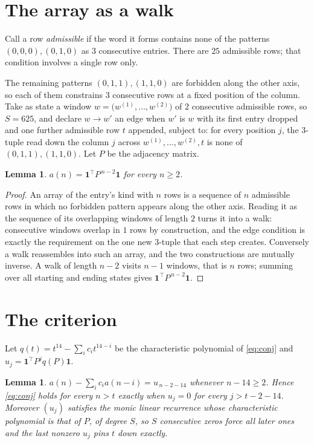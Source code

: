\documentclass[11pt,a4paper]{article}
\theoremstyle{plain}
\newtheorem{lemma}[theorem]{Lemma}
\theoremstyle{definition}
\begin{document}
\section{The array as a walk}

Call a row \emph{admissible} if the word it forms contains none of the patterns
$(0,0,0), (0,1,0)$ as $3$ consecutive entries. There are $25$ admissible rows; that condition
involves a single row only.

The remaining patterns $(0,1,1), (1,1,0)$ are forbidden along the other axis, so each of them
constrains $3$ consecutive rows at a fixed position of the column. Take as state a
window $w=\bigl(w^{(1)},\dots,w^{(2)}\bigr)$ of $2$ consecutive admissible
rows, so $S=625$, and declare $w\to w'$ an edge when $w'$ is $w$ with its first entry
dropped and one further admissible row $t$ appended, subject to: for every position
$j$, the $3$-tuple read down the column $j$ across $w^{(1)},\dots,w^{(2)},t$
is none of $(0,1,1), (1,1,0)$. Let $P$ be the adjacency matrix.

\begin{lemma}\label{lem:walk}
$a(n)=\mathbf{1}^{\!\top}P^{\,n-2}\mathbf{1}$ for every $n\ge2$.
\end{lemma}

\begin{proof}
An array of the entry's kind with $n$ rows is a sequence of $n$ admissible rows in
which no forbidden pattern appears along the other axis. Reading it as the sequence of its
overlapping windows of length $2$ turns it into a walk: consecutive windows overlap in
$1$ rows by construction, and the edge condition is exactly the requirement on the one
new $3$-tuple that each step creates. Conversely a walk reassembles into such an array,
and the two constructions are mutually inverse. A walk of length $n-2$ visits $n-1$
windows, that is $n$ rows; summing over all starting and ending states gives
$\mathbf{1}^{\!\top}P^{\,n-2}\mathbf{1}$.
\end{proof}

\section{The criterion}

Let $q(t)=t^{14}-\sum_i c_i t^{14-i}$ be the characteristic polynomial of
\eqref{eq:conj} and $u_j=\mathbf{1}^{\!\top}P^{j}q(P)\mathbf{1}$.

\begin{lemma}\label{lem:crit}
$a(n)-\sum_i c_i a(n-i)=u_{\,n-2-14}$ whenever $n-14\ge2$. Hence
\eqref{eq:conj} holds for every $n>t$ exactly when $u_j=0$ for every
$j>t-2-14$. Moreover $(u_j)$ satisfies the monic linear recurrence whose
characteristic polynomial is that of $P$, of degree $S$, so $S$ consecutive zeros force all
later ones and the last nonzero $u_j$ pins $t$ down exactly.
\end{lemma}
\end{document}

